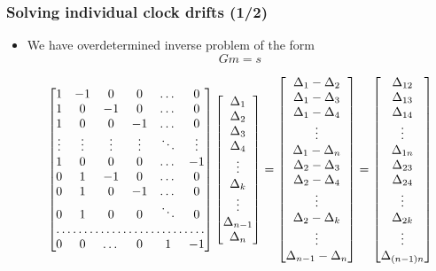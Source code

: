 \documentclass{beamer}
\begin{document}
\begin{frame}%
\frametitle{Solving individual clock drifts (1/2)}
\begin{itemize}
\item We have overdetermined inverse problem of the form
\begin{equation}
Gm = s
\end{equation}

\footnotesize
\begin{equation*}
\begin{bmatrix}
1 & -1 & 0 & 0 & \dots  & 0 \\
1 & 0 & -1 & 0 & \dots  & 0 \\
1 &  0  & 0 & -1 & \dots   & 0 \\
\vdots & \vdots & \vdots  & \vdots & \ddots & \vdots \\
1 &  0  & 0 & 0 & \dots & -1 \\
0 &  1  & -1 & 0 & \dots & 0 \\
0 & 1 & 0 & -1 & \dots & 0 \\
0 & 1 & 0 & 0 & \ddots & 0 \\
\hdotsfor{6} \\
0 & 0 & \dots & 0& 1 & -1
\end{bmatrix}
 \begin{bmatrix}
\Delta_1 \\ \Delta_2 \\ \Delta_3 \\ \Delta_4 \\ \vdots \\ \Delta_k \\ \vdots \\ \Delta_{n-1} \\ \Delta_n
\end{bmatrix}
 = 
 \begin{bmatrix}
 \Delta_1 - \Delta_2 \\ \Delta_1-\Delta_3 \\ \Delta_1-\Delta_4 \\ \vdots \\ \Delta_1 - \Delta_{n} \\ \Delta_2- \Delta_3 \\ \Delta_2 - \Delta_4 \\ \vdots  \\ \Delta_2-\Delta_k \\ \vdots \\ \Delta_{n-1} - \Delta_n
 \end{bmatrix}
= 
\begin{bmatrix}
\Delta_{12} \\ \Delta_{13} \\ \Delta_{14} \\ \vdots \\ \Delta_{1n} \\ \Delta_{23} \\ \Delta_{24} \\ \vdots \\ \Delta_{2k} \\ \vdots \\ \Delta_{(n-1)n}
\end{bmatrix} 
\end{equation*}
\normalsize


\end{itemize}
\end{frame}
\end{document}
